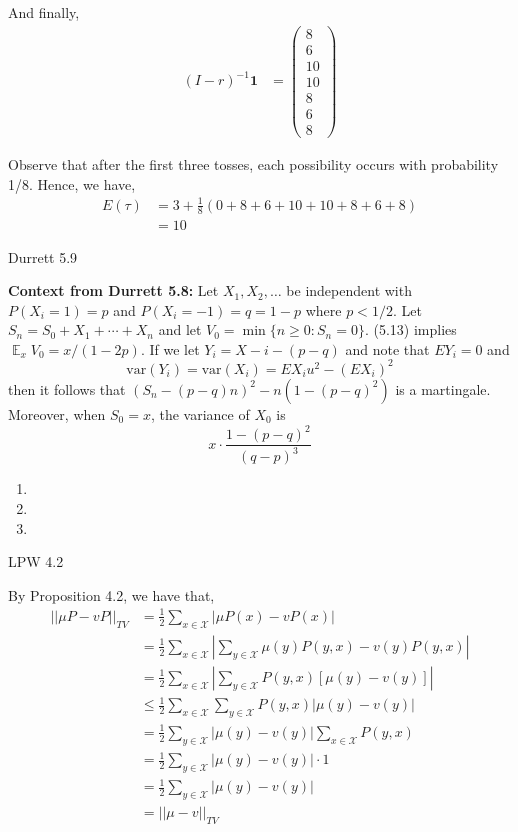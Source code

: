 \documentclass[12pt]{article}
\newenvironment{problem}[2][Problem]{\begin{trivlist}
\item[\hskip \labelsep {\bfseries #1}\hskip \labelsep {\bfseries #2.}]}{\end{trivlist}}
\DeclareMathOperator*{\E}{\mathbb{E}}
\begin{document}
And finally,
\begin{align*}
(I - r)^{-1}\mathbf{1} &= \begin{pmatrix}
8\\
6\\
10\\
10\\
8\\
6\\
8
\end{pmatrix}
\end{align*}

Observe that after the first three tosses, each possibility occurs with probability 1/8. Hence, we have,
\begin{align*}
E(\tau) &= 3 + \frac{1}{8}(0 + 8 + 6 + 10 + 10 + 8 + 6 + 8)\\
&= 10
\end{align*}

\begin{problem}{II}
Durrett 5.9
\end{problem}

\textbf{Context from Durrett 5.8:} Let $X_1, X_2, \ldots$ be independent with $P(X_i = 1) = p$ and $P(X_i = -1) = q = 1-p$ where $p < 1/2$. Let $S_n = S_0 + X_1 + \cdots + X_n$ and let $V_0 = \min\{n \geq 0 : S_n = 0\}$. (5.13) implies $\E_xV_0 = x/(1-2p)$. If we let $Y_i = X - i - (p-q)$ and note that $EY_i = 0$ and $$\text{var}(Y_i) = \text{var}(X_i) = EX_iu^2 - (EX_i)^2$$ then it follows that $(S_n - (p-q)n)^2 - n(1-(p-q)^2)$ is a martingale. Moreover, when $S_0 = x$, the variance of $X_0$ is $$x \cdot \frac{1 - (p-q)^2}{(q-p)^3}$$
\begin{enumerate}[label=(\alph*)]

\item

\item

\item

\end{enumerate}


\begin{problem}{III}
LPW 4.2
\end{problem}

By Proposition 4.2, we have that,
\begin{align*}
||\mu P - vP||_{TV} &= \frac{1}{2} \sum_{x \in \mathcal{X}} |\mu P(x) - vP(x)|\\
&= \frac{1}{2} \sum_{x \in \mathcal{X}} \left| \sum_{y \in \mathcal{X}} \mu(y) P(y, x) - v(y)P(y, x) \right|\\
&= \frac{1}{2} \sum_{x \in \mathcal{X}} \left| \sum_{y \in \mathcal{X}} P(y,x)[\mu(y) - v(y)] \right|\\
&\leq \frac{1}{2} \sum_{x \in \mathcal{X}} \sum_{y \in \mathcal{X}} P(y,x)|\mu(y) - v(y)|\\
&= \frac{1}{2} \sum_{y \in \mathcal{X}} |\mu(y) - v(y)| \sum_{x \in \mathcal{X}} P(y,x)\\
&= \frac{1}{2} \sum_{y \in \mathcal{X}} |\mu(y) - v(y)| \cdot 1\\
&= \frac{1}{2} \sum_{y \in \mathcal{X}} |\mu(y) - v(y)|\\
&= ||\mu - v||_{TV}
\end{align*}
\end{document}
